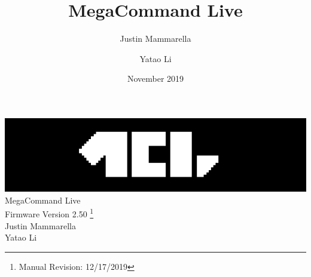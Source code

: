 \documentclass[openany,a4paper,12pt]{book}
\begin{document}
\author{
    Justin Mammarella
    \and
    Yatao Li
}
\title{MegaCommand Live}
\date{November 2019}

\frontmatter
\begin{titlepage}

	\begin{center}
	\vspace*{5.75cm}
	\includegraphics{mcl_logo_black_short.png}
    \vspace*{1.00cm}
	\LARGE
	\vspace*{0.65cm}
	\\MegaCommand Live
    \large
	\\Firmware Version 2.50
	\footnote{Manual Revision: 12/17/2019}
    \vspace*{2cm}
    \\Justin Mammarella
    \\Yatao Li
\end{center}
\end{titlepage}


\tableofcontents

\mainmatter











%

























\backmatter

\end{document}
